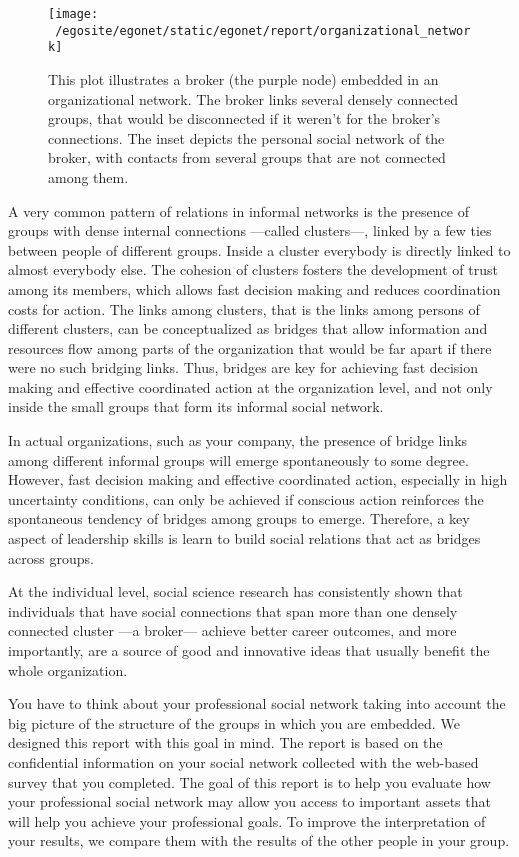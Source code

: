 \documentclass[a4paper,12pt]{article}
\begin{document}
\begin{figure}[H]
\centering
\texttt{[image: ~/egosite/egonet/static/egonet/report/organizational\_network]}
\caption{This plot illustrates a broker (the purple node) embedded in an organizational network. The broker links several densely connected groups, that would be disconnected if it weren't for the broker's connections. The inset depicts the personal social network of the broker, with contacts from several groups that are not connected among them.}
\end{figure}


A very common pattern of relations in informal networks is the presence of groups with dense internal connections ---called clusters---, linked by a few ties between people of different groups. Inside a cluster everybody is directly linked to almost everybody else. The cohesion of clusters fosters the development of trust among its members, which allows fast decision making and reduces coordination costs for action. The links among clusters, that is the links among persons of different clusters, can be conceptualized as bridges that allow information and resources flow among parts of the organization that would be far apart if there were no such bridging links. Thus, bridges are key for achieving fast decision making and effective coordinated action at the organization level, and not only inside the small groups that form its informal social network.

In actual organizations, such as your company, the presence of bridge links among different informal groups will emerge spontaneously to some degree. However, fast decision making and effective coordinated action, especially in high uncertainty conditions, can only be achieved if conscious action reinforces the spontaneous tendency of bridges among groups to emerge. Therefore, a key aspect of leadership skills is learn to build social relations that act as bridges across groups.

At the individual level, social science research has consistently shown that individuals that have social connections that span more than one densely connected cluster ---a broker--- achieve better career outcomes, and more importantly, are a source of good and innovative ideas that usually benefit the whole organization.

You have to think about your professional social network taking into account the big picture of the structure of the groups in which you are embedded. We designed this report with this goal in mind. The report is based on the confidential information on your social network collected with the web-based survey that you completed. The goal of this report is to help you evaluate how your professional social network may allow you access to important assets that will help you achieve your professional goals. To improve the interpretation of your results, we compare them with the results of the other people in your group.
\end{document}
